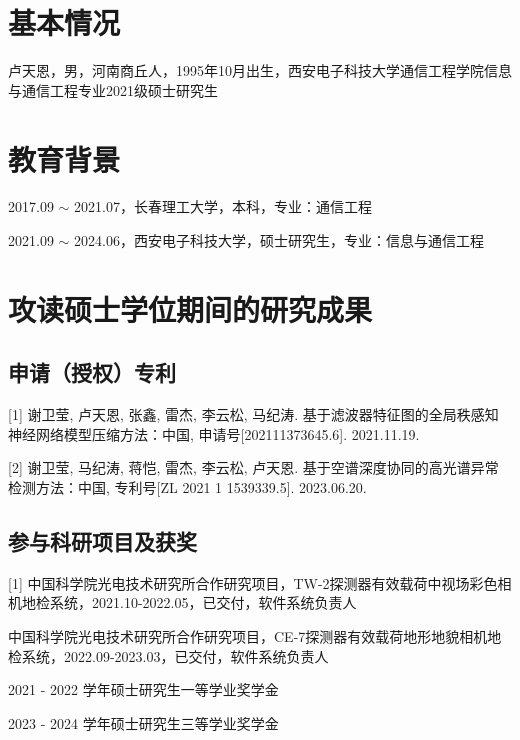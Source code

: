 \section{基本情况}
卢天恩，男，河南商丘人，1995年10月出生，西安电子科技大学通信工程学院信息与通信工程专业2021级硕士研究生

\section{教育背景}
2017.09 $\sim$ 2021.07，长春理工大学，本科，专业：通信工程
\par
2021.09 $\sim$ 2024.06，西安电子科技大学，硕士研究生，专业：信息与通信工程

\section{攻读硕士学位期间的研究成果}
\subsection{申请（授权）专利}
[1] 谢卫莹, 卢天恩, 张鑫, 雷杰, 李云松, 马纪涛. 基于滤波器特征图的全局秩感知神经网络模型压缩方法：中国, 申请号[202111373645.6]. 2021.11.19.
\par
[2] 谢卫莹, 马纪涛, 蒋恺, 雷杰, 李云松, 卢天恩. 基于空谱深度协同的高光谱异常检测方法：中国, 专利号[ZL 2021 1 1539339.5]. 2023.06.20.

\subsection{参与科研项目及获奖}
[1] 中国科学院光电技术研究所合作研究项目，TW-2探测器有效载荷中视场彩色相机地检系统，2021.10-2022.05，已交付，软件系统负责人
\par
[2] 中国科学院光电技术研究所合作研究项目，CE-7探测器有效载荷地形地貌相机地检系统，2022.09-2023.03，已交付，软件系统负责人
\par
[3] 2021 - 2022 学年硕士研究生一等学业奖学金
\par
[4] 2023 - 2024 学年硕士研究生三等学业奖学金
